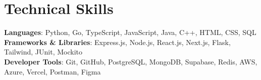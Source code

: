 \section{Technical Skills}
\begin{itemize}[leftmargin=0.15in, label={}]
    \small{\item{     
        \textbf{Languages}{: Python, Go, TypeScript, JavaScript, Java, C++, HTML, CSS, SQL} \\
     
        \textbf{Frameworks \& Libraries}{: Express.js, Node.js, React.js, Next.js, Flask, Tailwind, JUnit, Mockito} \\

        \textbf{Developer Tools}{: Git, GitHub, PostgreSQL, MongoDB, Supabase, Redis, AWS, Azure, Vercel, Postman, Figma} \\
    }}
\end{itemize}